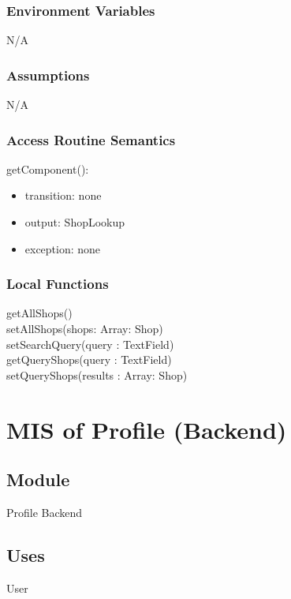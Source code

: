 \documentclass[12pt, titlepage]{article}
\begin{document}
\subsubsection{Environment Variables}

N/A

\subsubsection{Assumptions}

N/A

\subsubsection{Access Routine Semantics}

\noindent getComponent():
\begin{itemize}
    \item transition: none
    \item output: ShopLookup
    \item exception: none
\end{itemize}

\subsubsection{Local Functions}

getAllShops() \\
setAllShops(shops: Array: Shop) \\
setSearchQuery(query : TextField) \\
getQueryShops(query : TextField) \\
setQueryShops(results : Array: Shop) \\

\newpage

\section{MIS of Profile (Backend)} \label{accountsback}

\subsection{Module}

Profile Backend

\subsection{Uses}
User
\end{document}
